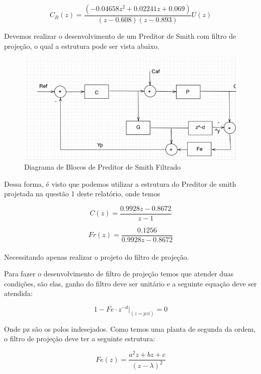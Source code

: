 \documentclass[a4paper,12pt]{article}
\begin{document}
\begin{equation}
C_{B}(z) =  \frac{(-0.04658z^2 + 0.02241z + 0.069)}{(z-0.608)(z-0.893)} U(z)
\end{equation}

Devemos realizar o desenvolvimento de um Preditor de Smith com filtro de projeção, o qual a estrutura pode ser vista abaixo.


\begin{figure} [h]
    \centering
    \includegraphics[width=0.8\linewidth]{image1.png}
    \caption{Diagrama de Blocos de Preditor de Smith Filtrado}
    \label{fig:enter-label}
\end{figure}

Dessa forma, é visto que podemos utilizar a estrutura do Preditor de smith projetada na questão 1 deste relatório, onde temos

\begin{equation}
C(z) = \frac{0.9928z - 0.8672}{z - 1}
\end{equation}

\begin{equation}
Fr(z) = \frac{0.1256}{0.9928z - 0.8672}
\end{equation}\\

Necessitando apenas realizar o projeto do filtro de projeção.


Para fazer o desenvolvimento de filtro de projeção temos que atender duas condições, são elas, ganho do filtro deve ser unitário e a seguinte equação deve ser atendida:

\begin{equation}
1 - Fe \cdot z^{-d} |_{(z=pzi)} = 0 
\end{equation}

Onde pz são os polos indesejados. Como temos uma planta de segunda da ordem, o filtro de projeção deve ter a seguinte estrutura:

\begin{equation}
Fe(z) = \frac{a^2z+bz+c}{(z-\lambda)^2}
\end{equation}
\end{document}
